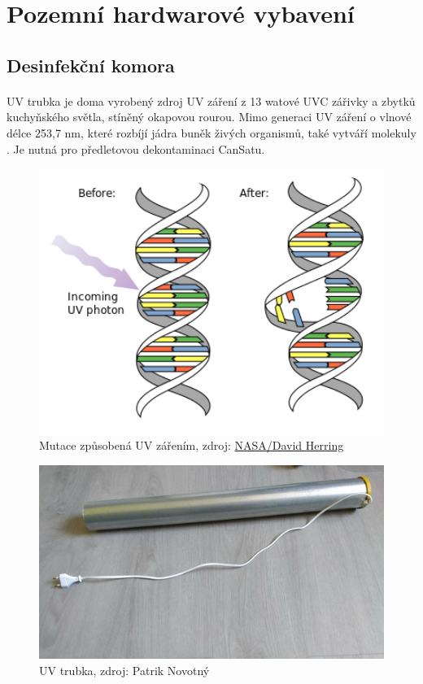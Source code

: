 \documentclass[a4paper]{report}
\begin{document}
\section{Pozemní hardwarové vybavení}
\subsection{Desinfekční komora}
\paragraph{} UV trubka je doma vyrobený zdroj UV záření z 13 watové UVC zářivky a zbytků kuchyňského světla, stíněný okapovou rourou. Mimo generaci UV záření o vlnové délce 253,7 nm, které rozbíjí jádra buněk živých organismů, také vytváří molekuly . Je nutná pro předletovou dekontaminaci CanSatu.
\begin{figure}[!h]
\centering
\caption{Mutace způsobená UV zářením, zdroj: \href{https://earthobservatory.nasa.gov/Features/UVB/}{NASA/David Herring}}
\includegraphics[width=400pt]{UVCmutation.png}
\end{figure}
\begin{figure}[!h]
\centering
\caption{UV trubka, zdroj: Patrik Novotný}
\includegraphics[width=400pt]{uv_lampa.jpg}
\end{figure}
\end{document}
